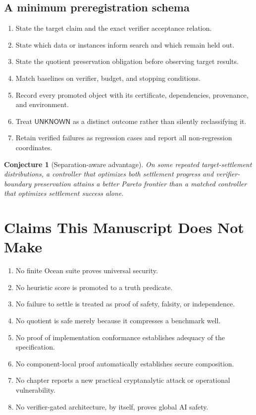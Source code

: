 \documentclass[11pt,oneside]{book}
\newtheorem{conjecture}[theorem]{Conjecture}
\theoremstyle{definition}
\theoremstyle{remark}
\newcommand{\UNKNOWN}{\mathsf{UNKNOWN}}
\begin{document}
\section{A minimum preregistration schema}
\begin{enumerate}[leftmargin=*]
\item State the target claim and the exact verifier acceptance relation.
\item State which data or instances inform search and which remain held out.
\item State the quotient preservation obligation before observing target results.
\item Match baselines on verifier, budget, and stopping conditions.
\item Record every promoted object with its certificate, dependencies, provenance, and environment.
\item Treat \(\UNKNOWN\) as a distinct outcome rather than silently reclassifying it.
\item Retain verified failures as regression cases and report all non-regression coordinates.
\end{enumerate}

\begin{conjecture}[Separation-aware advantage]
On some repeated target-settlement distributions, a controller that optimizes both settlement progress
and verifier-boundary preservation attains a better Pareto frontier than a matched controller that
optimizes settlement success alone.
\end{conjecture}

\chapter{Claims This Manuscript Does Not Make}

\begin{enumerate}[leftmargin=*]
\item No finite Ocean suite proves universal security.
\item No heuristic score is promoted to a truth predicate.
\item No failure to settle is treated as proof of safety, falsity, or independence.
\item No quotient is safe merely because it compresses a benchmark well.
\item No proof of implementation conformance establishes adequacy of the specification.
\item No component-local proof automatically establishes secure composition.
\item No chapter reports a new practical cryptanalytic attack or operational vulnerability.
\item No verifier-gated architecture, by itself, proves global AI safety.
\end{enumerate}
\end{document}
